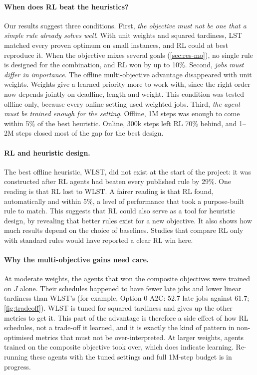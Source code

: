 \documentclass[12pt]{article}
\begin{document}
\paragraph{When does RL beat the heuristics?} Our results suggest three conditions. First, \emph{the objective must not be one that a simple rule already solves well}. With unit weights and squared tardiness, LST matched every proven optimum on small instances, and RL could at best reproduce it. When the objective mixes several goals (\cref{sec:res-mo}), no single rule is designed for the combination, and RL won by up to 10\%. Second, \emph{jobs must differ in importance}. The offline multi-objective advantage disappeared with unit weights. Weights give a learned priority more to work with, since the right order now depends jointly on deadline, length and weight. This condition was tested offline only, because every online setting used weighted jobs. Third, \emph{the agent must be trained enough for the setting}. Offline, 1M steps was enough to come within 5\% of the best heuristic. Online, 300k steps left RL 70\% behind, and 1--2M steps closed most of the gap for the best design.

\paragraph{RL and heuristic design.} The best offline heuristic, WLST, did not exist at the start of the project: it was constructed after RL agents had beaten every published rule by 29\%. One reading is that RL lost to WLST. A fairer reading is that RL found, automatically and within 5\%, a level of performance that took a purpose-built rule to match. This suggests that RL could also serve as a tool for heuristic design, by revealing that better rules exist for a new objective. It also shows how much results depend on the choice of baselines. Studies that compare RL only with standard rules would have reported a clear RL win here.

\paragraph{Why the multi-objective gains need care.} At moderate weights, the agents that won the composite objectives were trained on $J$ alone. Their schedules happened to have fewer late jobs and lower linear tardiness than WLST's (for example, Option 0 A2C: 52.7 late jobs against 61.7; \cref{fig:tradeoff}). WLST is tuned for squared tardiness and gives up the other metrics to get it. This part of the advantage is therefore a side effect of how RL schedules, not a trade-off it learned, and it is exactly the kind of pattern in non-optimised metrics that must not be over-interpreted. At larger weights, agents trained on the composite objective took over, which does indicate learning. Re-running these agents with the tuned settings and full 1M-step budget is in progress.
\end{document}
